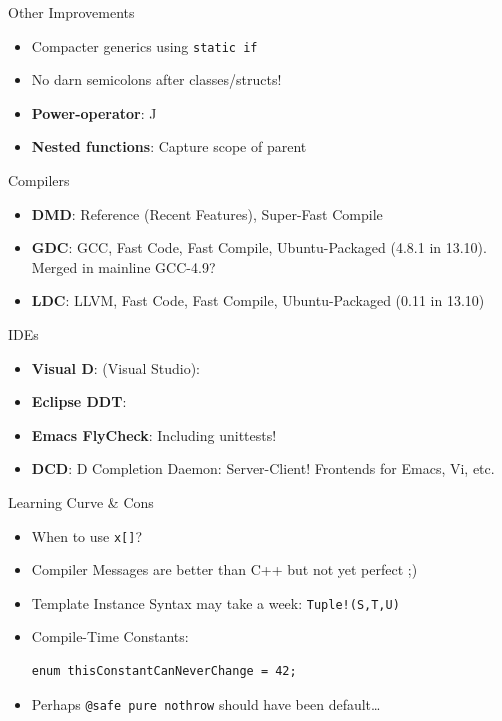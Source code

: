 \documentclass[xcolor=dvipsnames]{beamer}
\begin{document}
\begin{frame}[fragile]{Other Improvements}
  \begin{itemize}[<+->]
  \item Compacter generics using \texttt{static if}
  \item No darn semicolons after classes/structs!
  \item \textbf{Power-operator}: ^^
  \item \textbf{Nested functions}: Capture scope of parent
  \end{itemize}
\end{frame}

\begin{frame}[fragile]{Compilers}
  \begin{itemize}[<+->]
  \item \textbf{DMD}: Reference (Recent Features), Super-Fast Compile
  \item \textbf{GDC}: GCC, Fast Code, Fast Compile, Ubuntu-Packaged (4.8.1 in
    13.10). Merged in mainline GCC-4.9?
  \item \textbf{LDC}: LLVM, Fast Code, Fast Compile, Ubuntu-Packaged (0.11 in
    13.10)
  \end{itemize}
\end{frame}

\begin{frame}[fragile]{IDEs}
  \begin{itemize}[<+->]
  \item \textbf{Visual D}: (Visual Studio):
  \item \textbf{Eclipse DDT}:
  \item \textbf{Emacs FlyCheck}: Including unittests!
  \item \textbf{DCD}: D Completion Daemon: Server-Client! Frontends for Emacs,
    Vi, etc.
  \end{itemize}
\end{frame}

\begin{frame}[fragile]{Learning Curve \& Cons}
  \begin{itemize}[<+->]
  \item When to use \texttt{x[]}?
  \item Compiler Messages are better than C++ but not yet perfect ;)
  \item Template Instance Syntax may take a week: \texttt{Tuple!(S,T,U)}
  \item Compile-Time Constants:
\begin{lstlisting}[frame=single]
  enum thisConstantCanNeverChange = 42;
\end{lstlisting}
  \item Perhaps \texttt{@safe pure nothrow} should have been default\ldots
  \end{itemize}
\end{frame}
\end{document}
